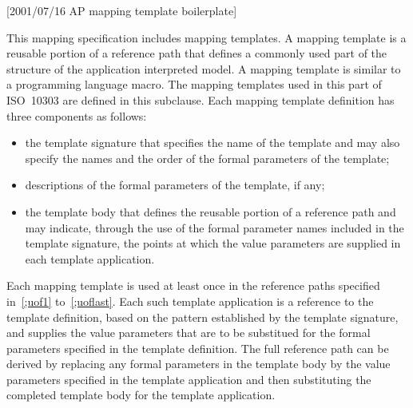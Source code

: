 [2001/07/16 AP mapping template boilerplate]

  This mapping specification includes mapping templates.
A mapping template is a reusable portion of a reference path that defines
a commonly used part of the structure of the application interpreted model.
A mapping template is similar to a programming language macro.
The mapping templates used in this part of ISO~10303 are defined in this
subclause. Each mapping template definition has three components as follows:
\begin{itemize}
\item the template signature that specifies the name of the template
      and may also specify the names and the order of the formal parameters
      of the template;

\item descriptions of the formal parameters of the template, if any;

\item the template body that defines the reusable portion of a reference
      path and may indicate, through the use of the formal parameter
      names included in the template signature, the points at which
      the value parameters are supplied in each template application.
\end{itemize}

    Each mapping template is used at least once in the reference paths
specified in~\ref{;uof1} to~\ref{;uoflast}.
Each such template application is a reference to the template definition,
based on the pattern established by the template signature, and supplies
the value parameters that are to be substitued for the formal parameters
specified in the template definition. The full reference path can be derived
by replacing any formal parameters in the template body by the value
parameters specified in the template application and then substituting
the completed template body for the template application.

